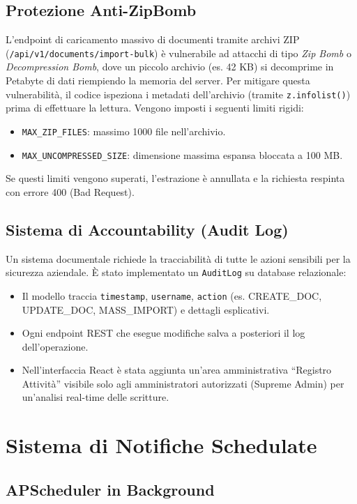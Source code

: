 \documentclass[12pt,a4paper,oneside]{report}
\begin{document}
\section{Protezione Anti-ZipBomb}
L'endpoint di caricamento massivo di documenti tramite archivi ZIP (\texttt{/api/v1/documents/import-bulk}) \`e vulnerabile ad attacchi di tipo \textit{Zip Bomb} o \textit{Decompression Bomb}, dove un piccolo archivio (es. 42 KB) si decomprime in Petabyte di dati riempiendo la memoria del server. 
Per mitigare questa vulnerabilit\`a, il codice ispeziona i metadati dell'archivio (tramite \texttt{z.infolist()}) prima di effettuare la lettura. Vengono imposti i seguenti limiti rigidi:
\begin{itemize}
    \item \texttt{MAX\_ZIP\_FILES}: massimo 1000 file nell'archivio.
    \item \texttt{MAX\_UNCOMPRESSED\_SIZE}: dimensione massima espansa bloccata a 100 MB.
\end{itemize}
Se questi limiti vengono superati, l'estrazione \`e annullata e la richiesta respinta con errore 400 (Bad Request).

\section{Sistema di Accountability (Audit Log)}
Un sistema documentale richiede la tracciabilit\`a di tutte le azioni sensibili per la sicurezza aziendale.
\`E stato implementato un \texttt{AuditLog} su database relazionale:
\begin{itemize}
    \item Il modello traccia \texttt{timestamp}, \texttt{username}, \texttt{action} (es. CREATE\_DOC, UPDATE\_DOC, MASS\_IMPORT) e dettagli esplicativi.
    \item Ogni endpoint REST che esegue modifiche salva a posteriori il log dell'operazione.
    \item Nell'interfaccia React \`e stata aggiunta un'area amministrativa ``Registro Attivit\`a'' visibile solo agli amministratori autorizzati (Supreme Admin) per un'analisi real-time delle scritture.
\end{itemize}

\chapter{Sistema di Notifiche Schedulate}

\section{APScheduler in Background}
\end{document}
